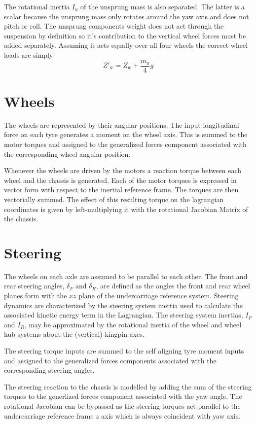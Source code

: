 The rotational inertia $I_u$ of the unsprung mass is also separated. The latter is a scalar because the unsprung mass only rotates around the yaw axis and does not pitch or roll.
The unsprung components weight does not act through the suspension by definition so it's contribution to the vertical wheel forces must be added separately. Assuming it acts equally over all four wheels the correct wheel loads are simply
$$Z'_w = Z_w + \frac{m_u}{4}g$$

\section{Wheels}
\label{sec:wheels}
The wheels are represented by their angular positions.
The input longitudinal force on each tyre generates a moment on the wheel axis. This is summed to the motor torques and assigned to the generalized forces component associated with the corresponding wheel angular position.

Whenever the wheels are driven by the motors a reaction torque between each wheel and the chassis is generated. Each of the motor torques is expressed in vector form with respect to the inertial reference frame. The torques are then vectorially summed. The effect of this resulting torque on the lagrangian coordinates is given by left-multiplying it with the rotational Jacobian Matrix of the chassis.



\section{Steering}
\label{sec:steering}
The wheels on each axle are assumed to be parallel to each other. The front and rear steering angles, $\delta_F$ and $\delta_R$, are defined as the angles the front and rear wheel planes form with the $xz$ plane of the undercarriage reference system. 
Steering dynamics are characterized by the steering system inertia used to calculate the associated kinetic energy term in the Lagrangian.
The steering system inertias, $I_F$ and $I_R$, may be approximated by the rotational inertia of the wheel and wheel hub systems about the (vertical) kingpin axes.

The steering torque inputs are summed to the self aligning tyre moment inputs and assigned to the generalized forces components associated with the corresponding steering angles.

The steering reaction to the chassis is modelled by adding the sum of the steering torques to the generlized forces component associated with the yaw angle. The rotational Jacobian can be bypassed as the steering torques act parallel to the undercarriage reference frame $z$ axis which is always coincident with yaw axis.
